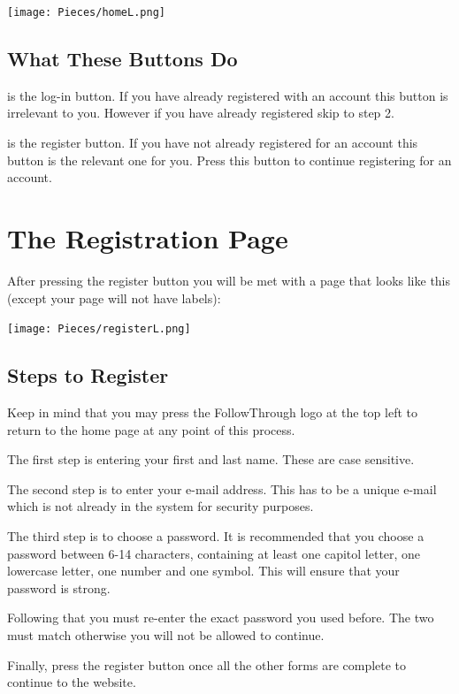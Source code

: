 \begin{center}
    \texttt{[image: Pieces/homeL.png]}
\end{center}

\subsection{What These Buttons Do}

\begin{enumerate}[{[1]}]
\item is the log-in button. If you have already registered with an account this button is irrelevant to you. However if you have already registered skip to step 2.
\item is the register button. If you have not already registered for an account this button is the relevant one for you. Press this button to continue registering for an account.
\end{enumerate}

\section{The Registration Page}
After pressing the register button you will be met with a page that looks like this (except your page will not have labels):

\begin{center}
    \texttt{[image: Pieces/registerL.png]}
\end{center}

\subsection{Steps to Register}
Keep in mind that you may press the FollowThrough logo at the top left to return to the home page at any point of this process.

\begin{enumerate}[{[1]}]
\item The first step is entering your first and last name. These are case sensitive.
\item The second step is to enter your e-mail address. This has to be a unique e-mail which is not already in the system for security purposes.
\item The third step is to choose a password. It is recommended that you choose a password between 6-14 characters, containing at least one capitol letter, one lowercase letter, one number and one symbol. This will ensure that your password is strong.
\item Following that you must re-enter the exact password you used before. The two must match otherwise you will not be allowed to continue.
\item Finally, press the register button once all the other forms are complete to continue to the website.
\end{enumerate}

